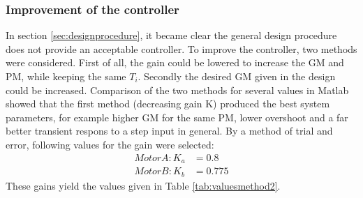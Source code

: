 \documentclass[a4paper,kul]{kulakarticle} %
\begin{document}
\newpage
\subsubsection{Improvement of the controller}
In section \ref{sec:designprocedure}, it became clear the general design procedure does not provide an acceptable controller. To improve the controller, two methods were considered. First of all, the gain could be lowered to increase the GM and PM, while keeping the same $T_i$. Secondly the desired GM given in the design could be increased. Comparison of the two methods for several values in Matlab showed that the first method (decreasing gain K) produced the best system parameters, for example higher GM for the same PM, lower overshoot and a far better transient respons to a step input in general. By a method of trial and error, following values for the gain were selected: 
\begin{equation}
	\begin{split}
	Motor A: K_a &= 0.8\\
	Motor B: K_b &= 0.775
	\end{split}
\end{equation}
These gains yield the values given in Table \ref{tab:valuesmethod2}. 
\end{document}
